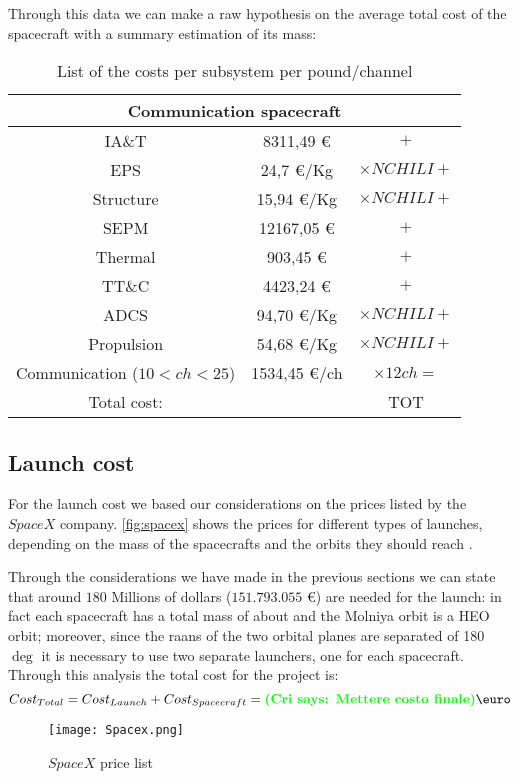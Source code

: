 	Through this data we can make a raw hypothesis on the average total cost of the spacecraft with a summary estimation of its mass:

	\begin{table}
		\centering
		\begin{tabular}{ccc}
		\toprule
		\multicolumn{3}{c}{Communication spacecraft}\\
		\midrule
		IA\&T       & 8311,49 \euro       & $+$\\
		EPS          & 24,7 \euro/Kg        & $\times NCHILI +$\\
		Structure   & 15,94  \euro/Kg     & $\times NCHILI +$\\
		SEPM        & 12167,05 \euro     & $+$\\
		Thermal    & 903,45 \euro        & $+$\\
		TT\&C       & 4423,24 \euro      & $+$\\
		ADCS        & 94,70 \euro/Kg     & $\times NCHILI +$\\
		Propulsion & 54,68   \euro/Kg   & $\times NCHILI +$\\
		Communication ($10 < ch < 25$) & 1534,45 \euro/ch & $\times 12 ch =$\\
		\bottomrule
		Total cost:& & TOT\\
		\end{tabular}
		\caption{List of the costs per subsystem per pound/channel}
		\label{tab:cost}
	\end{table}
\subsection{Launch cost}
For the launch cost we based our considerations on the prices listed by the $SpaceX$ company. \autoref{fig:spacex} shows the prices for different types of launches, depending on the mass of the spacecrafts and the orbits they should reach \cite{spacex}.

Through the considerations we have made in the previous sections we can state that around $180$ Millions of dollars ($151.793.055$ \euro {}) are needed for the launch: in fact each spacecraft has a total mass of about  and the Molniya orbit is a HEO orbit; moreover, since the raans of the two orbital planes are separated of 180 $\deg$ it is necessary to use two separate launchers, one for each spacecraft.\\

Through this analysis the total cost for the project is:
\begin{equation}
Cost_{Total} = Cost_{Launch} + Cost_{Spacecraft} = \cri{Mettere costo finale} \text{\euro}
\end{equation}

\begin{figure}[htbp]
\centering
\texttt{[image: Spacex.png]}
\caption{$SpaceX$ price list}
\label{fig:spacex}
\end{figure}
